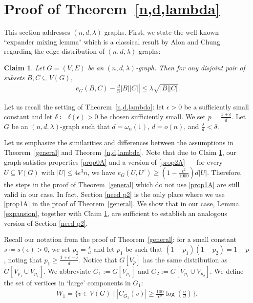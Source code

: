\documentclass[notitlepage]{scrartcl}
\newtheorem{claim}[thm]{Claim}
\begin{document}
\section{Proof of Theorem~\ref{n,d,lambda}} \label{Pn,d,lambda}

This section addresses $(n,d,\lambda)$-graphs. First, we state the well known ``expander mixing lemma" which is a classical result by Alon and Chung \cite{zbMATH04073036} regarding the edge distribution of $(n, d, \lambda)$-graphs:

\begin{claim} \label{original_eml}
    Let $G = (V, E)$ be an $(n, d, \lambda)$-graph. Then for any disjoint pair of subsets $B,C\subseteq V(G)$,
    \begin{align*}
        \left|e_G(B,C)-\frac{d}{n}|B||C|\right|\le \lambda\sqrt{|B||C|}.
    \end{align*}
\end{claim} 

Let us recall the setting of Theorem~\ref{n,d,lambda}: let $\epsilon>0$ be a sufficiently small constant and let $\delta\coloneqq \delta(\epsilon)>0$ be chosen sufficiently small. We set $p=\frac{1+\epsilon}{d}$. Let $G$ be an $(n,d,\lambda)$-graph such that $d=\omega_n(1)$, $d=o(n)$, and $\frac{\lambda}{d}<\delta$. 

Let us emphasize the similarities and differences between the assumptions in Theorem~\ref{general} and Theorem~\ref{n,d,lambda}. Note that due to Claim \ref{original_eml}, our graph satisfies properties \ref{prop0A} and a version of \ref{prop2A} --- for every $U\subseteq V(G)$ with $|U|\le 4\epsilon^3n$, we have $e_G(U,U^c)\ge \left(1-\frac{\epsilon^2}{1000}\right)d|U|$. Therefore, the steps in the proof of Theorem~\ref{general} which do not use \ref{prop1A} are still valid in our case. In fact, Section \ref{need p2} is the only place where we use \ref{prop1A} in the proof of Theorem~\ref{general}. We show that in our case, Lemma \ref{expansion}, together with Claim \ref{original_eml}, are sufficient to establish an analogous version of Section \ref{need p2}.

Recall our notation from the proof of Theorem~\ref{general}: for a small constant $s\coloneqq s(\epsilon)>0$, we set $p_2=\frac{s}{d}$ and let $p_1$ be such that $(1-p_1)(1-p_2)=1-p$, noting that $p_1\geq \frac{1+\epsilon-s}{d}$. Notice that $G[V_p]$ has the same distribution as $G[V_{p_1}\cup V_{p_2}]$. We abbreviate $G_1:=G[V_{p_1}]$ and $G_2:=G[V_{p_1}\cup V_{p_2}]$.
We define the set of vertices in ‘large’ components in $G_1$:
\begin{align*}
    W_1=\bigg\{v\in V(G)\;\bigg|\; |C_{G_1}(v)|\geq \frac{100}{\epsilon^2}\log \left(\frac{n}{d}\right)\bigg\}.
\end{align*}
\end{document}
